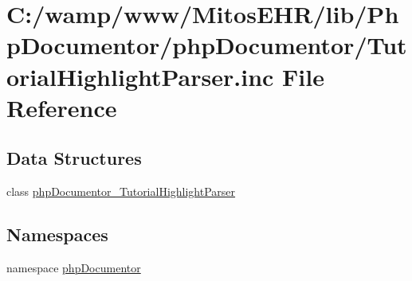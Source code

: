 \hypertarget{_tutorial_highlight_parser_8inc}{\section{\-C\-:/wamp/www/\-Mitos\-E\-H\-R/lib/\-Php\-Documentor/php\-Documentor/\-Tutorial\-Highlight\-Parser.inc \-File \-Reference}
\label{_tutorial_highlight_parser_8inc}
}
\subsection*{\-Data \-Structures}
\begin{DoxyCompactItemize}
\item 
class \hyperlink{classphp_documentor___tutorial_highlight_parser}{php\-Documentor\-\_\-\-Tutorial\-Highlight\-Parser}
\end{DoxyCompactItemize}
\subsection*{\-Namespaces}
\begin{DoxyCompactItemize}
\item 
namespace \hyperlink{namespacephp_documentor}{php\-Documentor}
\end{DoxyCompactItemize}
